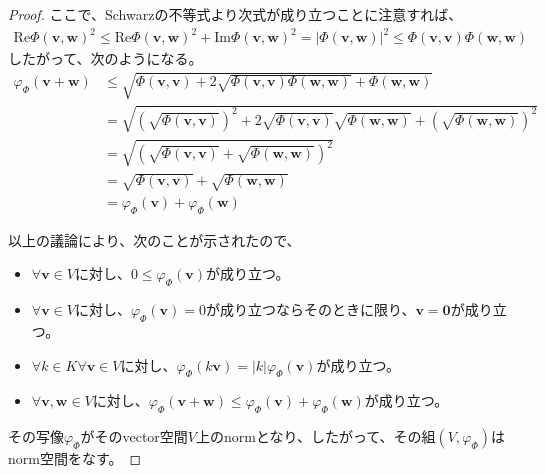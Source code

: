 \documentclass[dvipdfmx]{jsarticle}
\begin{document}
\begin{proof}
ここで、Schwarzの不等式より次式が成り立つことに注意すれば、
\begin{align*}
{\mathrm{Re}{\varPhi\left( \mathbf{v},\mathbf{w} \right)}}^{2} \leq {\mathrm{Re}{\varPhi\left( \mathbf{v},\mathbf{w} \right)}}^{2} + {\mathrm{Im}{\varPhi\left( \mathbf{v},\mathbf{w} \right)}}^{2} = \left| \varPhi\left( \mathbf{v},\mathbf{w} \right) \right|^{2} \leq \varPhi\left( \mathbf{v},\mathbf{v} \right)\varPhi\left( \mathbf{w},\mathbf{w} \right)
\end{align*}
したがって、次のようになる。
\begin{align*}
\varphi_{\varPhi}\left( \mathbf{v} + \mathbf{w} \right) &\leq \sqrt{\varPhi\left( \mathbf{v},\mathbf{v} \right) + 2\sqrt{\varPhi\left( \mathbf{v},\mathbf{v} \right)\varPhi\left( \mathbf{w},\mathbf{w} \right)} + \varPhi\left( \mathbf{w},\mathbf{w} \right)}\\
&= \sqrt{\left( \sqrt{\varPhi\left( \mathbf{v},\mathbf{v} \right)} \right)^{2} + 2\sqrt{\varPhi\left( \mathbf{v},\mathbf{v} \right)}\sqrt{\varPhi\left( \mathbf{w},\mathbf{w} \right)} + \left( \sqrt{\varPhi\left( \mathbf{w},\mathbf{w} \right)} \right)^{2}}\\
&= \sqrt{\left( \sqrt{\varPhi\left( \mathbf{v},\mathbf{v} \right)} + \sqrt{\varPhi\left( \mathbf{w},\mathbf{w} \right)} \right)^{2}}\\
&= \sqrt{\varPhi\left( \mathbf{v},\mathbf{v} \right)} + \sqrt{\varPhi\left( \mathbf{w},\mathbf{w} \right)}\\
&= \varphi_{\varPhi}\left( \mathbf{v} \right) + \varphi_{\varPhi}\left( \mathbf{w} \right)
\end{align*}\par
以上の議論により、次のことが示されたので、
\begin{itemize}
\item
  $\forall\mathbf{v} \in V$に対し、$0 \leq \varphi_{\varPhi}\left( \mathbf{v} \right)$が成り立つ。
\item
  $\forall\mathbf{v} \in V$に対し、$\varphi_{\varPhi}\left( \mathbf{v} \right) = 0$が成り立つならそのときに限り、$\mathbf{v} = \mathbf{0}$が成り立つ。
\item
  $\forall k \in K\forall\mathbf{v} \in V$に対し、$\varphi_{\varPhi}\left( k\mathbf{v} \right) = |k|\varphi_{\varPhi}\left( \mathbf{v} \right)$が成り立つ。
\item
  $\forall\mathbf{v},\mathbf{w} \in V$に対し、$\varphi_{\varPhi}\left( \mathbf{v} + \mathbf{w} \right) \leq \varphi_{\varPhi}\left( \mathbf{v} \right) + \varphi_{\varPhi}\left( \mathbf{w} \right)$が成り立つ。
\end{itemize}
その写像$\varphi_{\varPhi}$がそのvector空間$V$上のnormとなり、したがって、その組$\left( V,\varphi_{\varPhi} \right)$はnorm空間をなす。
\end{proof}
\end{document}
